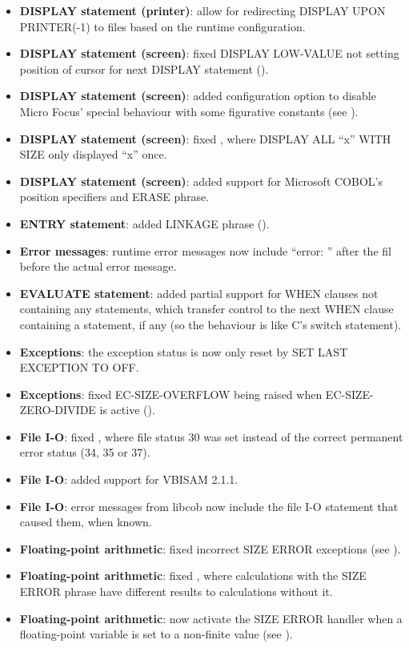 \begin{itemize}
\item \textbf{DISPLAY statement (printer)}: allow for redirecting DISPLAY UPON PRINTER(-1) to files based on the runtime configuration.
\item \textbf{DISPLAY statement (screen)}: fixed DISPLAY LOW-VALUE not setting position of cursor for next DISPLAY statement ().
\item \textbf{DISPLAY statement (screen)}: added configuration option to disable Micro Focus' special behaviour with some figurative constants (see ).
\item \textbf{DISPLAY statement (screen)}: fixed , where DISPLAY ALL ``x'' WITH SIZE only displayed ``x'' once.
\item \textbf{DISPLAY statement (screen)}: added support for Microsoft COBOL's position specifiers and ERASE phrase.
\item \textbf{ENTRY statement}: added LINKAGE phrase ().
\item \textbf{Error messages}: runtime error messages now include ``error: '' after the fil before the actual error message.
\item \textbf{EVALUATE statement}: added partial support for WHEN clauses not containing any statements, which transfer control to the next WHEN clause containing a statement, if any (so the behaviour is like C's switch statement).
\item \textbf{Exceptions}: the exception status is now only reset by SET LAST EXCEPTION TO OFF.
\item \textbf{Exceptions}: fixed EC-SIZE-OVERFLOW being raised when EC-SIZE-ZERO-DIVIDE is active ().
\item \textbf{File I-O}: fixed , where file status 30 was set instead of the correct permanent error status (34, 35 or 37).
\item \textbf{File I-O}: added support for VBISAM 2.1.1.
\item \textbf{File I-O}: error messages from libcob now include the file I-O statement that caused them, when known.
\item \textbf{Floating-point arithmetic}: fixed incorrect SIZE ERROR exceptions (see ).
\item \textbf{Floating-point arithmetic}: fixed , where calculations with the SIZE ERROR phrase have different results to calculations without it.
\item \textbf{Floating-point arithmetic}: now activate the SIZE ERROR handler when a floating-point variable is set to a non-finite value (see ).

\end{itemize}
